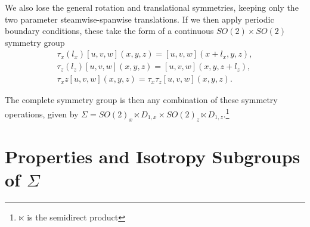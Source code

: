 We also lose the general rotation and translational symmetries, keeping only the two parameter steamwise-spanwise translations. If we then apply periodic boundary conditions, these take the form of a continuous $SO(2)\times SO(2)$ symmetry group 
\begin{align}
\tau_x(l_x)[u,v,w](x,y,z) = [u,v,w](x+l_x,y,z),\label{eq:contsymm}\\
\tau_z(l_z)[u,v,w](x,y,z) = [u,v,w](x,y,z+l_z),\\
\tau_xz[u,v,w](x,y,z) = \tau_x\tau_z[u,v,w](x,y,z).
\end{align}

The complete symmetry group is then any combination of these symmetry operations, given by $\Sigma = SO(2)_x \ltimes D_{1,x} \times SO(2)_z \ltimes D_{1,z}.$\footnote{$\ltimes$ is the semidirect product}
\section{Properties and Isotropy Subgroups of $\Sigma$}

